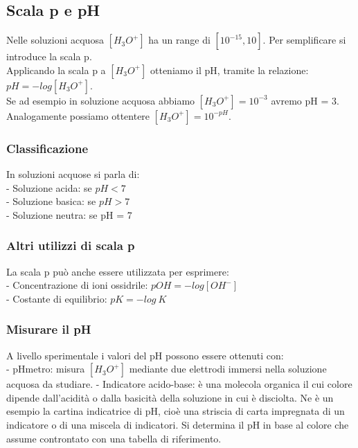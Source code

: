 \subsection{Scala p e pH}
Nelle soluzioni acquosa $\left[H_3O^+\right]$ ha un range di $\left[10^{-15}, 10\right]$. Per semplificare si introduce la scala p.\\
Applicando la scala p a $\left[H_3O^+\right]$ otteniamo il pH, tramite la relazione: $pH = -log\left[H_3O^+\right]$.\\
Se ad esempio in soluzione acquosa abbiamo $\left[H_3O^+\right]= 10^{-3}$ avremo pH = 3.\\
Analogamente possiamo ottentere $\left[H_3O^+\right] = 10^{-pH}$.
\subsubsection{Classificazione}
In soluzioni acquose si parla di:\\
\tab- Soluzione acida: se $pH < 7$\\
\tab- Soluzione basica: se $pH > 7$\\
\tab- Soluzione neutra: se pH = 7
\subsubsection{Altri utilizzi di scala p}
La scala p può anche essere utilizzata per esprimere:\\
\tab- Concentrazione di ioni ossidrile: $pOH = -log[OH^-]$\\
\tab- Costante di equilibrio: $pK = -log\ K$
\subsubsection{Misurare il pH}
A livello sperimentale i valori del pH possono essere ottenuti con:\\
\tab- pHmetro: misura $\left[H_3O^+\right]$ mediante due elettrodi immersi nella soluzione acquosa da studiare. 
\tab- Indicatore acido-base: è una molecola organica il cui colore dipende dall'acidità o dalla basicità della soluzione in cui è disciolta. Ne è un esempio la cartina indicatrice di pH, cioè una striscia di carta impregnata di un indicatore o di una miscela di indicatori. Si determina il pH in base al colore che assume controntato con una tabella di riferimento.
